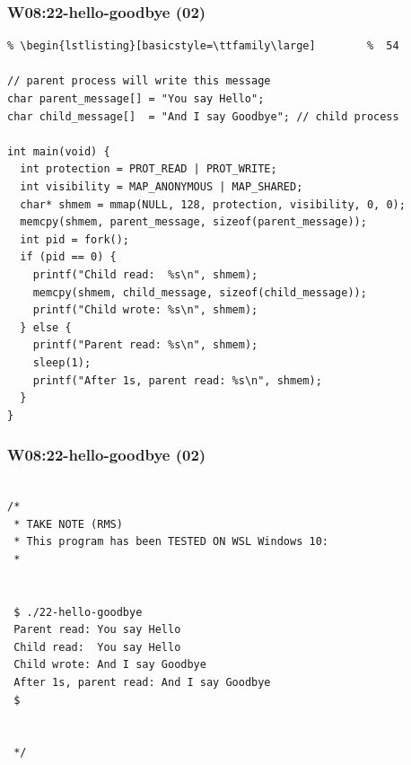 \documentclass[aspectratio=169, xcolor=table, notheorems, hyperref={pdfpagelabels=false}]{beamer}
\begin{document}
\begin{frame}[fragile]
\frametitle{W08:22-hello-goodbye (02)}
\begin{lstlisting}[basicstyle=\ttfamily\footnotesize] %  72
% \begin{lstlisting}[basicstyle=\ttfamily\small]        %  65
% \begin{lstlisting}[basicstyle=\ttfamily\large]        %  54

// parent process will write this message
char parent_message[] = "You say Hello";  
char child_message[]  = "And I say Goodbye"; // child process 

int main(void) {
  int protection = PROT_READ | PROT_WRITE;
  int visibility = MAP_ANONYMOUS | MAP_SHARED;
  char* shmem = mmap(NULL, 128, protection, visibility, 0, 0);
  memcpy(shmem, parent_message, sizeof(parent_message));
  int pid = fork();
  if (pid == 0) {
    printf("Child read:  %s\n", shmem);
    memcpy(shmem, child_message, sizeof(child_message));
    printf("Child wrote: %s\n", shmem);
  } else {
    printf("Parent read: %s\n", shmem);
    sleep(1);
    printf("After 1s, parent read: %s\n", shmem);
  }
}

\end{lstlisting}
\end{frame}

\begin{frame}[fragile]
\frametitle{W08:22-hello-goodbye (02)}
\begin{lstlisting}[basicstyle=\ttfamily\large]        %  54

/*
 * TAKE NOTE (RMS)
 * This program has been TESTED ON WSL Windows 10:
 *


 $ ./22-hello-goodbye 
 Parent read: You say Hello
 Child read:  You say Hello
 Child wrote: And I say Goodbye
 After 1s, parent read: And I say Goodbye
 $


 */


\end{lstlisting}
\end{frame}
\end{document}

